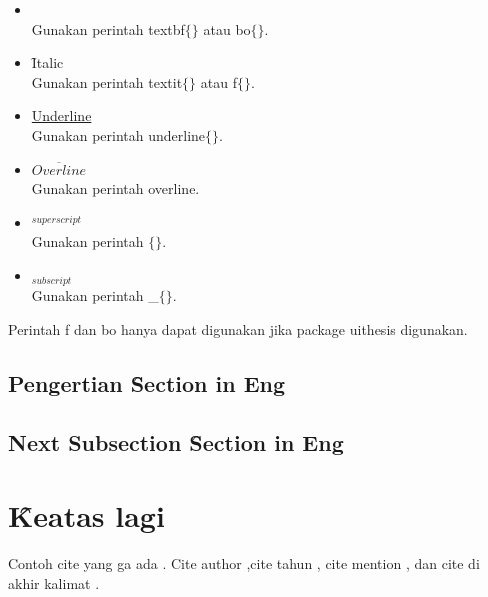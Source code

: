 \begin{itemize}
	\item {} \\
		Gunakan perintah \bslash textbf$\lbrace\rbrace$ atau 
		\bslash bo$\lbrace\rbrace$. 
	\item \f{Italic} \\
		Gunakan perintah \bslash textit$\lbrace\rbrace$ atau 
		\bslash f$\lbrace\rbrace$. 
	\item \underline{Underline} \\
		Gunakan perintah \bslash underline$\lbrace\rbrace$.
	\item $\overline{Overline}$ \\
		Gunakan perintah \bslash overline. 
	\item $^{superscript}$ \\
		Gunakan perintah \bslash $\lbrace\rbrace$. 
	\item $_{subscript}$ \\
		Gunakan perintah \bslash \_$\lbrace\rbrace$. 
\end{itemize}

Perintah \bslash f dan \bslash bo hanya dapat digunakan jika package 
uithesis digunakan. 
\subsection{Pengertian \f{Section in Eng}}

\subsection{Next Subsection \f{Section in Eng}}

\section{\f{Keatas lagi}}
Contoh cite yang ga ada \cite{gaib}. Cite author \citeauthor{article.rebecca},cite tahun \citeyear{article.treese}, cite mention \cite{adin.experiment}, dan cite di akhir kalimat \citep{techreport.nist}.
